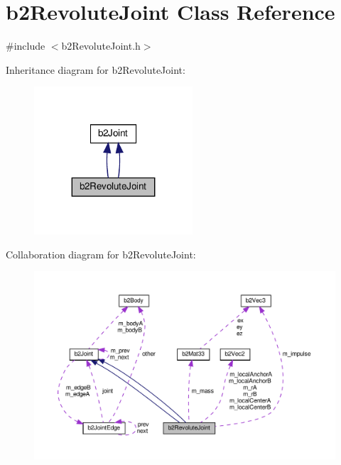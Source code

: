 \hypertarget{classb2RevoluteJoint}{}\section{b2\+Revolute\+Joint Class Reference}
\label{classb2RevoluteJoint}


{\ttfamily \#include $<$b2\+Revolute\+Joint.\+h$>$}



Inheritance diagram for b2\+Revolute\+Joint\+:
\nopagebreak
\begin{figure}[H]
\begin{center}
\leavevmode
\includegraphics[width=167pt]{classb2RevoluteJoint__inherit__graph}
\end{center}
\end{figure}


Collaboration diagram for b2\+Revolute\+Joint\+:
\nopagebreak
\begin{figure}[H]
\begin{center}
\leavevmode
\includegraphics[width=350pt]{classb2RevoluteJoint__coll__graph}
\end{center}
\end{figure}
